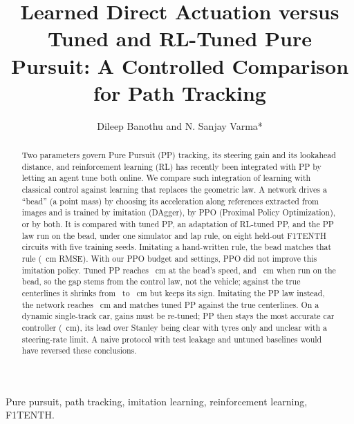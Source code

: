 \documentclass{IJCAS}
\begin{document}
\title{Learned Direct Actuation versus Tuned and RL-Tuned Pure Pursuit: A Controlled Comparison for Path Tracking}

\author{Dileep Banothu and N. Sanjay Varma*}

\begin{abstract}
Two parameters govern Pure Pursuit (PP) tracking, its steering gain and its lookahead distance, and reinforcement learning (RL) has recently been integrated with PP by letting an agent tune both online. We compare such integration of learning with classical control against learning that replaces the geometric law. A network drives a ``bead'' (a point mass) by choosing its acceleration along references extracted from images and is trained by imitation (DAgger), by PPO (Proximal Policy Optimization), or by both. It is compared with tuned PP, an adaptation of RL-tuned PP, and the PP law run on the bead, under one simulator and lap rule, on eight held-out F1TENTH circuits with five training seeds. Imitating a hand-written rule, the bead matches that rule (\VrmseDagger~cm RMSE). With our PPO budget and settings, PPO did not improve this imitation policy. Tuned PP reaches \VrmseFixM~cm at the bead's speed, and \VrmseBpp~cm when run on the bead, so the gap stems from the control law, not the vehicle; against the true centerlines it shrinks from \VcmpPoneDiff\ to \VtruePoneDiff~cm but keeps its sign. Imitating the PP law instead, the network reaches \VrmseDaggerBpp~cm and matches tuned PP against the true centerlines. On a dynamic single-track car, gains must be re-tuned; PP then stays the most accurate car controller (\VrmseDtFixH~cm), its lead over Stanley being clear with tyres only and unclear with a steering-rate limit. A naive protocol with test leakage and untuned baselines would have reversed these conclusions.
\end{abstract}

\begin{keywords}
Pure pursuit, path tracking, imitation learning, reinforcement learning, F1TENTH.
\end{keywords}

\maketitle

\end{document}
